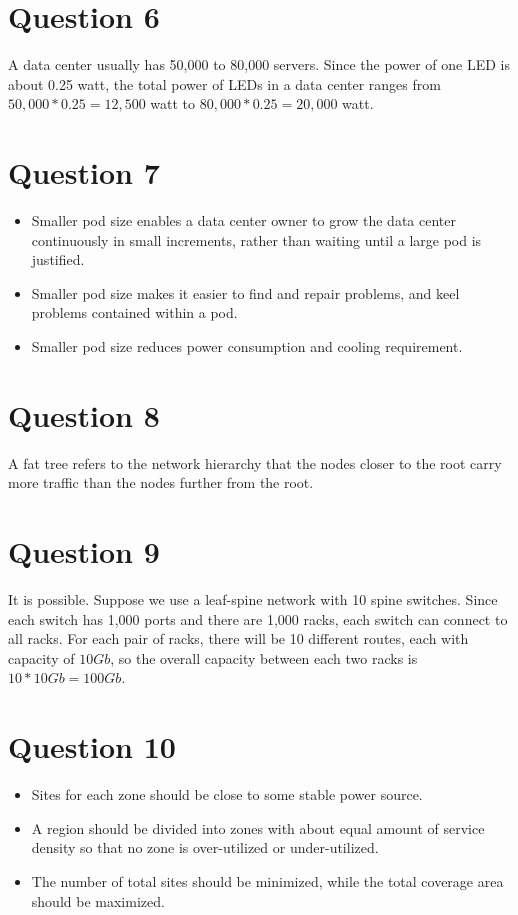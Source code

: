 \documentclass{article}
\begin{document}
\section{Question 6}
A data center usually has 50,000 to 80,000 servers. Since the power of one LED is about 0.25 watt, the total power of LEDs in a data center ranges from $50,000*0.25 = 12,500$ watt to $80,000*0.25 = 20,000$ watt.

\section{Question 7}
\begin{itemize}
\item Smaller pod size enables a data center owner to grow the data center continuously in small increments, rather than waiting until a large pod is justified.
\item Smaller pod size makes it easier to find and repair problems, and keel problems contained within a pod.
\item Smaller pod size reduces power consumption and cooling requirement.
\end{itemize}

\section{Question 8}
A fat tree refers to the network hierarchy that the nodes closer to the root carry more traffic than the nodes further from the root.

\section{Question 9}
It is possible. Suppose we use a leaf-spine network with 10 spine switches. Since each switch has 1,000 ports and there are 1,000 racks, each switch can connect to all racks. For each pair of racks, there will be 10 different routes, each with capacity of $10Gb$, so the overall capacity between each two racks is $10 * 10Gb = 100Gb$.

\section{Question 10}
\begin{itemize}
\item Sites for each zone should be close to some stable power source.
\item A region should be divided into zones with about equal amount of service density so that no zone is over-utilized or under-utilized.
\item The number of total sites should be minimized, while the total coverage area should be maximized.
\end{itemize}
\end{document}

